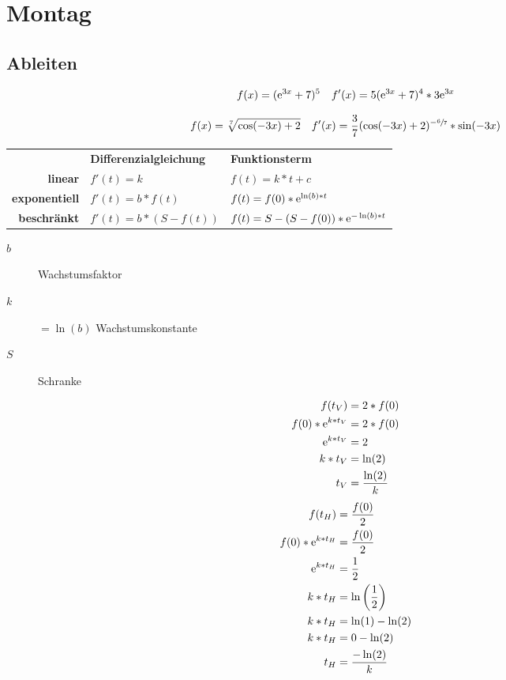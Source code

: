 

\usepackage{xfrac}
\everymath{\displaystyle}


\section{Montag}
\subsection{Ableiten}

\begin{equation*}
  f(x)=(\mathrm{e}^{3x}+7)^5\quad f'(x)=5(\mathrm{e}^{3x}+7)^4*3\mathrm{e}^{3x}
\end{equation*}

\begin{equation*}
  f(x)=\sqrt[7]{\cos(-3x)+2} \quad f'(x)=\frac 3 7(\cos(-3x)+2)^{-\sfrac{6}{7}}*\sin(-3x)
\end{equation*}







\clearpage
\vspace*{5em}
\renewcommand*{\arraystretch}{1.4}
\begin{tabular}{r|l|l}
								& \bf Differenzialgleichung & \bf Funktionsterm\\
	\bf linear 				& $f'(t)=k$ 						&	$f(t)=k*t+c$ \\
	\bf exponentiell 	& $f'(t)=b*f(t)$ 				& $f(t)=f(0)*\mathrm{e}^{\ln(b)*t}$\\
	\bf beschränkt 		& $f'(t)=b*(S-f(t))$ 		& $f(t)=S-(S-f(0))*\mathrm{e}^{-\ln(b)*t}$ \\
\end{tabular}
\vspace{3em3}
\begin{description}
	\item[$b$] Wachstumsfaktor
	\item[$k$] $=\ln(b)$ Wachstumskonstante
	\item[$S$] Schranke
\end{description}

\clearpage
\begin{align*}
	f(t_V)&=2*f(0)\\
	f(0)*\mathrm{e}^{k*t_V}&=2*f(0)\\
	\mathrm{e}^{k*t_V}&=2\\
	k*t_V&=\ln(2)\\
	t_V&=\frac{\ln(2)}{k}
\end{align*}
\begin{align*}
	f(t_H)&=\frac{f(0)}{2}\\
	f(0)*\mathrm{e}^{k*t_H}&=\frac{f(0)}{2}\\
	\mathrm{e}^{k*t_H}&=\frac{1}{2}\\
	k*t_H&=\ln\left(\frac12\right)\\
	k*t_H&=\ln(1)-\ln(2)\\
	k*t_H&=0-\ln(2)\\
	t_H&=\frac{-\ln(2)}{k}\\
\end{align*}

